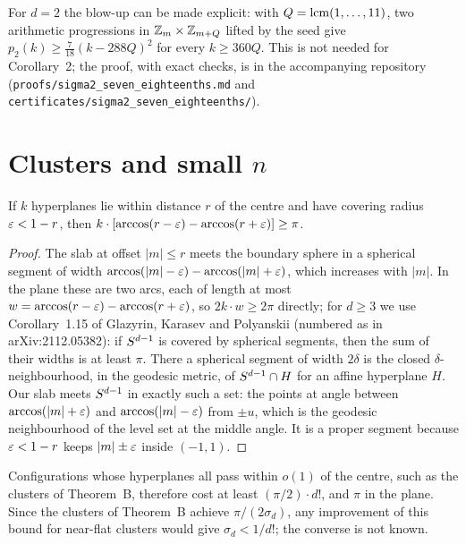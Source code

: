 \documentclass[11pt]{article}
\begin{document}
\begin{remark}
For $d = 2$ the blow-up can be made explicit: with $Q = \operatorname{lcm}(1, \dots, 11)$, two arithmetic progressions in
$\mathbb{Z}_m \times \mathbb{Z}_{m+Q}$ lifted by the seed give $p_2(k) \ge \frac{7}{18}(k - 288Q)^2$ for every $k \ge 360Q$. This is
not needed for Corollary~2; the proof, with exact checks, is in the accompanying repository
(\texttt{proofs/\allowbreak sigma2\_\allowbreak seven\_\allowbreak eighteenths.md} and \texttt{certificates/\allowbreak sigma2\_\allowbreak seven\_\allowbreak eighteenths/}).
\end{remark}

\section{Clusters and small \texorpdfstring{$n$}{n}}\label{sec:small}

\begin{proposition}\label{prop:clusters}
If $k$ hyperplanes lie within distance $r$ of the centre and have covering radius $\varepsilon<1-r$, then
$k\cdot[\arccos(r-\varepsilon)-\arccos(r+\varepsilon)]\ge\pi$.
\end{proposition}

\begin{proof}
The slab at offset $|m|\le r$ meets the boundary sphere in a spherical segment of width
$\arccos(|m|-\varepsilon)-\arccos(|m|+\varepsilon)$, which increases with $|m|$. In the plane these are two arcs, each of length at most $w=\arccos(r-\varepsilon)-\arccos(r+\varepsilon)$, so
$2k\cdot w\ge2\pi$ directly; for $d\ge3$ we use Corollary~1.15 of Glazyrin, Karasev and Polyanskii
\cite{GKP} (numbered as in arXiv:2112.05382): if $S^{d-1}$ is covered by spherical segments, then the sum of their widths is at least
$\pi$. There a spherical segment of width $2\delta$ is the closed $\delta$-neighbourhood, in the
geodesic metric, of $S^{d-1}\cap H$ for an affine hyperplane $H$. Our slab meets $S^{d-1}$ in
exactly such a set: the points at angle between $\arccos(|m|+\varepsilon)$ and $\arccos(|m|-\varepsilon)$ from $\pm u$,
which is the geodesic neighbourhood of the level set at the middle angle. It is a proper segment because
$\varepsilon<1-r$ keeps $|m|\pm\varepsilon$ inside $(-1,1)$.
\end{proof}

Configurations whose hyperplanes all pass within $o(1)$ of the centre, such as the clusters of
Theorem~B, therefore cost at least $(\pi/2)\cdot d!$, and $\pi$ in the plane. Since
the clusters of Theorem~B achieve $\pi/(2\sigma_d)$, any improvement of this bound for near-flat
clusters would give $\sigma_d<1/d!$; the converse is not known.
\end{document}

